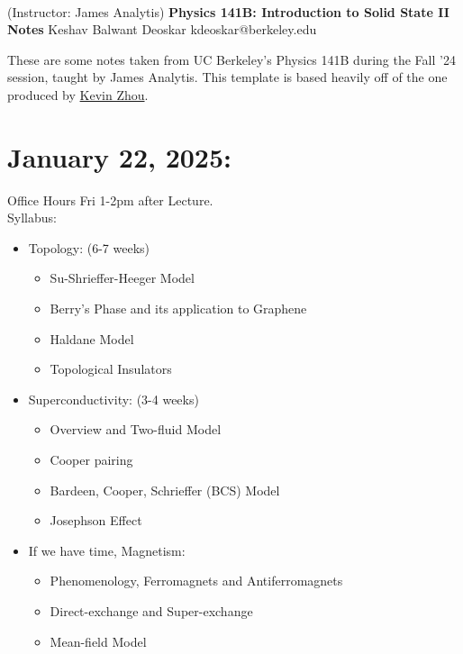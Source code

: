 \documentclass[11pt]{article}
\begin{document}
\thispagestyle{empty}
\bigskip \
\vspace{0.1cm}

\begin{center}
{\fontsize{22}{22} \selectfont (Instructor: James Analytis)}
\vskip 16pt
{\fontsize{36}{36} \selectfont \bf \sffamily Physics 141B: Introduction to Solid State II Notes}
\vskip 24pt
{\fontsize{18}{18} \selectfont \rmfamily Keshav Balwant Deoskar} 
\vskip 6pt
{\fontsize{14}{14} \selectfont \ttfamily kdeoskar@berkeley.edu} 
\vskip 24pt
\end{center} These are some notes taken from UC Berkeley's Physics 141B during the Fall '24 session, taught by James Analytis. This template is based heavily off of the one produced by \href{https://knzhou.github.io/}{Kevin Zhou}.

\tableofcontents 


\pagebreak
\section{January 22, 2025:}

Office Hours Fri 1-2pm after Lecture.\\
Syllabus: 
\begin{itemize}
  \item Topology: (6-7 weeks)
  \begin{itemize}
    \item Su-Shrieffer-Heeger Model
    \item Berry's Phase and its application to Graphene
    \item Haldane Model
    \item Topological Insulators
  \end{itemize}

  \item Superconductivity: (3-4 weeks)
  \begin{itemize}
    \item Overview and Two-fluid Model
    \item Cooper pairing
    \item Bardeen, Cooper, Schrieffer (BCS) Model
    \item Josephson Effect
  \end{itemize}

  \item If we have time, Magnetism: 
  \begin{itemize}
    \item Phenomenology, Ferromagnets and Antiferromagnets
    \item Direct-exchange and Super-exchange
    \item Mean-field Model
  \end{itemize}
\end{itemize}
\end{document}
